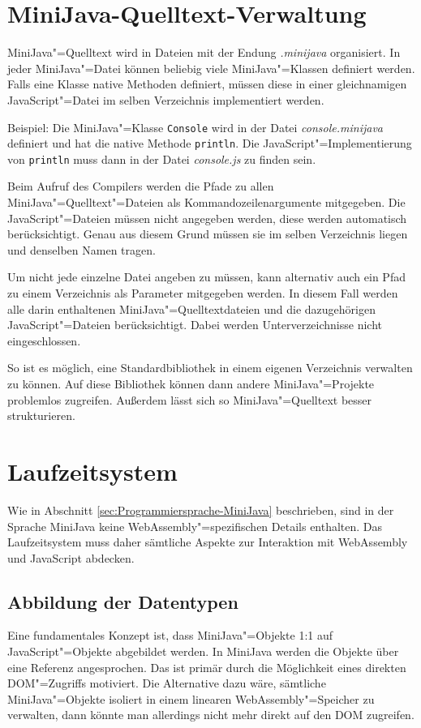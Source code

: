 

\section{MiniJava-Quelltext-Verwaltung}

MiniJava"=Quelltext wird in Dateien mit der Endung \emph{.minijava} organisiert. In jeder MiniJava"=Datei können beliebig viele MiniJava"=Klassen definiert werden. Falls eine Klasse native Methoden definiert, müssen diese in einer gleichnamigen JavaScript"=Datei im selben Verzeichnis implementiert werden.

Beispiel: Die MiniJava"=Klasse \lstinline{Console} wird in der Datei \emph{console.minijava} definiert und hat die native Methode \lstinline{println}. Die JavaScript"=Implementierung von \lstinline{println} muss dann in der Datei \emph{console.js} zu finden sein.

Beim Aufruf des Compilers werden die Pfade zu allen MiniJava"=Quelltext"=Dateien als Kommandozeilenargumente mitgegeben. Die JavaScript"=Dateien müssen nicht angegeben werden, diese werden automatisch berücksichtigt. Genau aus diesem Grund müssen sie im selben Verzeichnis liegen und denselben Namen tragen.

Um nicht jede einzelne Datei angeben zu müssen, kann alternativ auch ein Pfad zu einem Verzeichnis als Parameter mitgegeben werden. In diesem Fall werden alle darin enthaltenen MiniJava"=Quelltextdateien und die dazugehörigen JavaScript"=Dateien berücksichtigt. Dabei werden Unterverzeichnisse nicht eingeschlossen.

So ist es möglich, eine Standardbibliothek in einem eigenen Verzeichnis verwalten zu können. Auf diese Bibliothek können dann andere MiniJava"=Projekte problemlos zugreifen. Außerdem lässt sich so MiniJava"=Quelltext besser strukturieren.

\section{Laufzeitsystem}

Wie in Abschnitt \ref{sec:Programmiersprache-MiniJava} beschrieben, sind in der Sprache MiniJava keine WebAssembly"=spezifischen Details enthalten. Das Laufzeitsystem muss daher sämtliche Aspekte zur Interaktion mit WebAssembly und JavaScript abdecken.

\subsection{Abbildung der Datentypen}
Eine fundamentales Konzept ist, dass MiniJava"=Objekte 1:1 auf JavaScript"=Objekte abgebildet werden. In MiniJava werden die Objekte über eine Referenz angesprochen. Das ist primär durch die Möglichkeit eines direkten DOM"=Zugriffs motiviert. Die Alternative dazu wäre, sämtliche MiniJava"=Objekte isoliert in einem linearen WebAssembly"=Speicher zu verwalten, dann könnte man allerdings nicht mehr direkt auf den DOM zugreifen.

